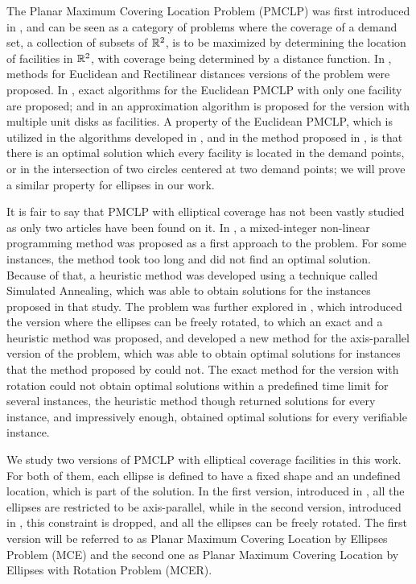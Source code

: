 The Planar Maximum Covering Location Problem (PMCLP) was first introduced in \cite{church:1984}, and can be seen as a category of problems where the coverage of a demand set, a collection of subsets of $\mathbb{R}^2$, is to be maximized by determining the location of facilities in $\mathbb{R}^2$, with coverage being determined by a distance function.
In \cite{church:1984}, methods for Euclidean and Rectilinear distances versions of the problem were proposed.
In \cite{drezner, chazelle:1986}, exact algorithms for the Euclidean PMCLP with only one facility are proposed; and in \cite{cabello:2006} an approximation algorithm is proposed for the version with multiple unit disks as facilities.
A property of the Euclidean PMCLP, which is utilized in the algorithms developed in \cite{drezner, chazelle:1986, cabello:2006}, and in the method proposed in \cite{church:1984}, is that there is an optimal solution which every facility is located in the demand points, or in the intersection of two circles centered at two demand points; we will prove a similar property for ellipses in our work.

It is fair to say that PMCLP with elliptical coverage has not been vastly studied as only two articles have been found on it. In \cite{canbolat}, a mixed-integer non-linear programming method was proposed as a first approach to the problem. For some instances, the method took too long and did not find an optimal solution. Because of that, a heuristic method was developed using a technique called Simulated Annealing, which was able to obtain solutions for the instances proposed in that study.
The problem was further explored in \cite{andreta}, which introduced the version where the ellipses can be freely rotated, to which an exact and a heuristic method was proposed, and developed a new method for the axis-parallel version of the problem, which was able to obtain optimal solutions for instances that the method proposed by \cite{canbolat} could not.
The exact method for the version with rotation could not obtain optimal solutions within a predefined time limit for several instances, the heuristic method though returned solutions for every instance, and impressively enough, obtained optimal solutions for every verifiable instance.

We study two versions of PMCLP with elliptical coverage facilities in this work. For both of them, each ellipse is defined to have a fixed shape and an undefined location, which is part of the solution.
In the first version, introduced in \cite{canbolat}, all the ellipses are restricted to be axis-parallel, while in the second version, introduced in \cite{andreta}, this constraint is dropped, and all the ellipses can be freely rotated.
The first version will be referred to as Planar Maximum Covering Location by Ellipses Problem (MCE) and the second one as  Planar Maximum Covering Location by Ellipses with Rotation Problem (MCER).

	
